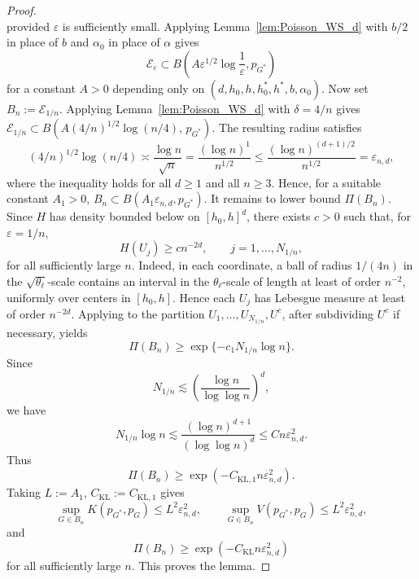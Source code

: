 \documentclass[twoside,12pt]{article}
\begin{document}
\begin{proof}
\begin{displaymath}
\end{displaymath}
provided $\varepsilon$ is sufficiently small. Applying Lemma~\ref{lem:Poisson_WS_d} with $b/2$ in place of $b$ and $\alpha_0$ in place of
$\alpha$ gives
\begin{displaymath}
\mathcal E_\varepsilon\subset B\!\left(A\varepsilon^{1/2}\log\frac{1}{\varepsilon},p_{G^\ast}\right)
\end{displaymath}
for a constant $A>0$ depending only on $(d,h_0,h,h_0^\ast,h^\ast,b,\alpha_0)$. Now set $B_n:=\mathcal E_{1/n}$. Applying Lemma~\ref{lem:Poisson_WS_d} with $\delta=4/n$ gives $\mathcal{E}_{1/n}\subset B\!\left(A(4/n)^{1/2}\log(n/4),\,p_{G^\ast}\right)$. The resulting radius satisfies
\begin{displaymath}
(4/n)^{1/2}\log(n/4)\asymp \frac{\log n}{\sqrt{n}}=\frac{(\log n)^1}{n^{1/2}}\le\frac{(\log n)^{(d+1)/2}}{n^{1/2}}=\varepsilon_{n,d},
\end{displaymath}
where the inequality holds for all $d\ge 1$ and all $n\ge 3$. Hence, for a suitable constant $A_1>0$, $B_n\subset B(A_1\varepsilon_{n,d},p_{G^\ast})$. It remains to lower bound $\Pi(B_n)$. Since $H$ has density bounded below on $[h_{0},h]^d$, there exists $c>0$ such that, for $\varepsilon=1/n$,
\begin{displaymath}
H(U_j)\ge c n^{-2d},\qquad j=1,\ldots,N_{1/n},
\end{displaymath}
for all sufficiently large $n$. Indeed, in each coordinate, a ball of radius $1/(4n)$ in the $\sqrt{\theta_\ell}$-scale contains an interval in the $\theta_\ell$-scale of length at least of order $n^{-2}$, uniformly over centers in $[h_{0},h]$. Hence each $U_j$ has Lebesgue measure at least of order $n^{-2d}$. Applying \citet[Lemma A.2]{Gho(01)} to the partition $U_1,\ldots,U_{N_{1/n}},U^c$, after subdividing $U^c$ if necessary, yields
\begin{displaymath}
\Pi(B_n)\ge\exp\{-c_1N_{1/n}\log n\}.
\end{displaymath}
Since
\begin{displaymath}
N_{1/n}\lesssim\left(\frac{\log n}{\log\log n}\right)^d,
\end{displaymath}
we have
\begin{displaymath}
N_{1/n}\log n\lesssim\frac{(\log n)^{d+1}}{(\log\log n)^d}\le C n\varepsilon_{n,d}^2.
\end{displaymath}
Thus
\begin{displaymath}
\Pi(B_n)\ge \exp(-C_{\mathrm{KL},1}n\varepsilon_{n,d}^2).
\end{displaymath}
Taking $L:=A_1$, $C_{\mathrm{KL}}:=C_{\mathrm{KL},1}$ gives
\begin{displaymath}
\sup_{G\in B_n}K(p_{G^\ast},p_G)\le L^2\varepsilon_{n,d}^2,\qquad \sup_{G\in B_n}V(p_{G^\ast},p_G)\le L^2\varepsilon_{n,d}^2,
\end{displaymath}
and
\begin{displaymath}
\Pi(B_n)\ge \exp(-C_{\mathrm{KL}}n\varepsilon_{n,d}^2)
\end{displaymath}
for all sufficiently large $n$. This proves the lemma.
\end{proof}
\end{document}

